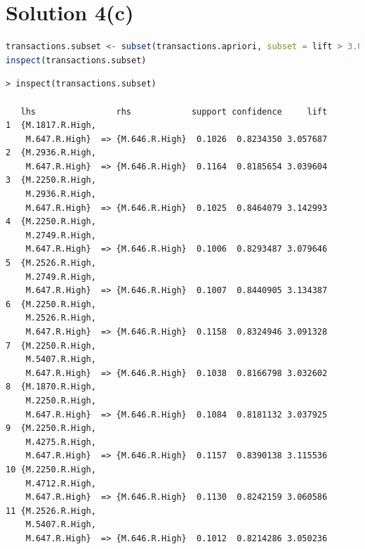 \documentclass[a4paper,20pt]{article}
\begin{document}
\section*{Solution 4(c)}
\begin{lstlisting}[language = R]
transactions.subset <- subset(transactions.apriori, subset = lift > 3.0)
inspect(transactions.subset)
\end{lstlisting}
\begin{verbatim}
> inspect(transactions.subset)

   lhs                rhs            support confidence     lift
1  {M.1817.R.High,                                              
    M.647.R.High}  => {M.646.R.High}  0.1026  0.8234350 3.057687
2  {M.2936.R.High,                                              
    M.647.R.High}  => {M.646.R.High}  0.1164  0.8185654 3.039604
3  {M.2250.R.High,                                              
    M.2936.R.High,                                              
    M.647.R.High}  => {M.646.R.High}  0.1025  0.8464079 3.142993
4  {M.2250.R.High,                                              
    M.2749.R.High,                                              
    M.647.R.High}  => {M.646.R.High}  0.1006  0.8293487 3.079646
5  {M.2526.R.High,                                              
    M.2749.R.High,                                              
    M.647.R.High}  => {M.646.R.High}  0.1007  0.8440905 3.134387
6  {M.2250.R.High,                                              
    M.2526.R.High,                                              
    M.647.R.High}  => {M.646.R.High}  0.1158  0.8324946 3.091328
7  {M.2250.R.High,                                              
    M.5407.R.High,                                              
    M.647.R.High}  => {M.646.R.High}  0.1038  0.8166798 3.032602
8  {M.1870.R.High,                                              
    M.2250.R.High,                                              
    M.647.R.High}  => {M.646.R.High}  0.1084  0.8181132 3.037925
9  {M.2250.R.High,                                              
    M.4275.R.High,                                              
    M.647.R.High}  => {M.646.R.High}  0.1157  0.8390138 3.115536
10 {M.2250.R.High,                                              
    M.4712.R.High,                                              
    M.647.R.High}  => {M.646.R.High}  0.1130  0.8242159 3.060586
11 {M.2526.R.High,                                              
    M.5407.R.High,                                              
    M.647.R.High}  => {M.646.R.High}  0.1012  0.8214286 3.050236

\end{verbatim}
\end{document}
